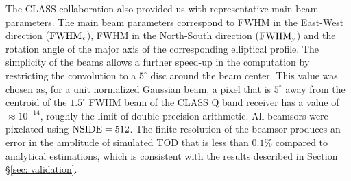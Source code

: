 \documentclass[a4paper,11pt]{article}
\begin{document}

The CLASS collaboration also provided us with representative main beam parameters. The main beam parameters correspond to FWHM in the East-West direction ($\rm{FWHM}_x$), FWHM in the North-South direction ($\rm{FWHM}_y$) and the rotation angle of the major axis of the corresponding elliptical profile. The simplicity of the beams allows a further speed-up in the computation by restricting the convolution to a $5^\circ$ disc around the beam center. This value was chosen as, for a unit normalized Gaussian beam, a pixel that is $5^\circ$ away from the centroid of the $1.5^{\circ}$ FWHM beam of the CLASS Q band receiver has a value of $\approx 10^{-14}$, roughly the limit of double precision arithmetic. All beamsors were pixelated using $\rm{NSIDE}=512$. The finite resolution of the beamsor produces an error in the amplitude of simulated TOD that is less than $0.1\%$ compared to analytical estimations, which is consistent with the results described in Section \S\ref{sec::validation}.

\end{document}
